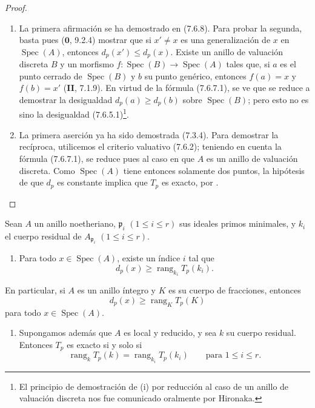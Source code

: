 \begin{proof}
\begin{enumerate}
  \item[(i)] La primera afirmación se ha demostrado en (7.6.8). Para probar
    la segunda, basta pues ($\mathbf{0}$, 9.2.4) mostrar que si $x'\ne x$ es una generalización de $x$ en
$\operatorname{Spec}(A)$, entonces $d_p(x')\leq d_p(x)$. Existe un anillo de
valuación discreta $B$ y un morfismo
$f:\operatorname{Spec}(B)\longrightarrow\operatorname{Spec}(A)$
tales que, si $a$ es el punto cerrado de $\operatorname{Spec}(B)$ y $b$ su punto
genérico, entonces $f(a)=x$ y $f(b)=x'$ (\textbf{II}, 7.1.9). En virtud de la fórmula (7.6.7.1), se ve que se reduce a demostrar la desigualdad $d_p(a)\geq d_p(b)$ sobre $\operatorname{Spec}(B)$; pero esto no es sino la desigualdad (7.6.5.1)\footnote{El principio de demostración de (i) por reducción al caso de un anillo de valuación discreta nos fue comunicado oralmente por Hironaka.}.
\item[(ii)] La primera aserción ya ha sido demostrada (7.3.4). Para demostrar la recíproca, utilicemos el criterio valuativo (7.6.2); teniendo en cuenta la fórmula (7.6.7.1), se reduce pues al caso en que $A$ es un anillo
de valuación discreta. Como $\operatorname{Spec}(A)$ tiene entonces solamente dos
puntos, la hipótesis de que $d_p$ es constante implica que $T_p$ es
exacto, por .
\end{enumerate}
\end{proof}

\begin{corollary}[7.6.10]
\label{III.7.6.10}
Sean $A$ un anillo noetheriano, $\mathfrak p_i$ $(1\leq i\leq r)$
sus ideales primos minimales, y $k_i$ el cuerpo residual de
$A_{\mathfrak p_i}$
$(1\leq i\leq r)$.
\begin{enumerate}
  \item[\textup{(i)}] Para todo $x\in\operatorname{Spec}(A)$, existe un índice $i$ tal que
    \[
      d_p(x)\geq\operatorname{rang}_{k_i}T_p(k_i).
      \tag{7.6.10.1}\label{III.7.6.10.1.fr}
    \]
\end{enumerate}
En particular, si $A$ es un anillo íntegro y $K$ es su cuerpo de
fracciones, entonces
\[
  d_p(x)\geq\operatorname{rang}_K T_p(K)
  \tag{7.6.10.2}\label{III.7.6.10.2.fr}
\]
para todo $x\in\operatorname{Spec}(A)$.

\begin{enumerate}
  \item[\textup{(ii)}] Supongamos además que $A$ es local y reducido, y sea
    $k$ su cuerpo residual. Entonces $T_p$ es exacto si y solo si
    \[
      \operatorname{rang}_k T_p(k)
      =
      \operatorname{rang}_{k_i}T_p(k_i)
      \qquad\text{para }1\leq i\leq r.
      \tag{7.6.10.3}\label{III.7.6.10.3.fr}
    \]
\end{enumerate}
\end{corollary}

